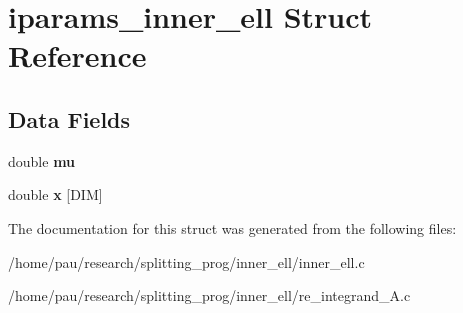 \hypertarget{structiparams__inner__ell}{
\section{iparams\_\-inner\_\-ell Struct Reference}
\label{structiparams__inner__ell}
}
\subsection*{Data Fields}
\begin{DoxyCompactItemize}
\item 
\hypertarget{structiparams__inner__ell_a74577585cf12d1712ab9c57616d49205}{
double {\bfseries mu}}
\label{structiparams__inner__ell_a74577585cf12d1712ab9c57616d49205}

\item 
\hypertarget{structiparams__inner__ell_a39b352d59ec4a0f52678b90c8d1fa23a}{
double {\bfseries x} \mbox{[}DIM\mbox{]}}
\label{structiparams__inner__ell_a39b352d59ec4a0f52678b90c8d1fa23a}

\end{DoxyCompactItemize}


The documentation for this struct was generated from the following files:\begin{DoxyCompactItemize}
\item 
/home/pau/research/splitting\_\-prog/inner\_\-ell/inner\_\-ell.c\item 
/home/pau/research/splitting\_\-prog/inner\_\-ell/re\_\-integrand\_\-A.c\end{DoxyCompactItemize}
